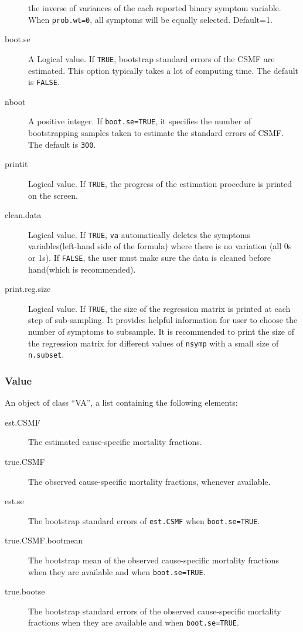 \documentclass[oneside,letterpaper,titlepage]{article}
\begin{document}
\begin{description}
  the inverse of variances of the each reported binary symptom variable.   
  When \texttt{prob.wt=0}, all symptoms will be equally selected. 
  Default=1.
\item[boot.se] A Logical value. If \texttt{TRUE}, bootstrap standard
  errors of the CSMF are estimated.  This option typically takes a lot
  of computing time. The default is \texttt{FALSE}.
\item[nboot] A positive integer. If \texttt{boot.se=TRUE}, it
  specifies the number of bootstrapping samples taken to estimate the
  standard errors of CSMF. The default is \texttt{300}.
\item[printit] Logical value. If \texttt{TRUE}, the progress of the
  estimation procedure is printed on the screen.
 \item[clean.data] Logical value. If \texttt{TRUE}, \texttt{va}
    automatically deletes the symptoms variables(left-hand side of the
    formula) where there is no variation (all 0s or 1s). If
    \texttt{FALSE}, the user must make sure the data is cleaned before
    hand(which is recommended). 
  \item[print.reg.size] Logical value. If \texttt{TRUE}, the size of the
  regression matrix is printed at each step of sub-sampling. It provides
  helpful information for user to choose the number of symptoms to
  subsample. It is recommended to print the size of the regression
  matrix for different values of \texttt{nsymp} with a small size of
  \texttt{n.subset}. 
\end{description}

\subsubsection{Value}

An object of class ``VA'', a list containing the following elements:
\begin{description}
\item[est.CSMF] The estimated cause-specific mortality fractions.
\item[true.CSMF] The observed cause-specific mortality fractions,
  whenever available.
\item[est.se] The bootstrap standard errors of \texttt{est.CSMF} when
  \texttt{boot.se=TRUE}.
\item[true.CSMF.bootmean] The bootstrap mean of the observed
  cause-specific mortality fractions when they are available and when
  \texttt{boot.se=TRUE}.
\item[true.bootse] The bootstrap standard errors of the observed
  cause-specific mortality fractions when they are available and when
  \texttt{boot.se=TRUE}.
 \end{description}
\end{document}
